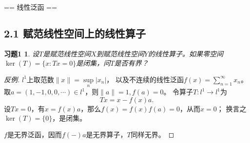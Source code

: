 \newcommand{\De}{\mathbf{\Delta}}
\newcommand{\D}{\mathbb{D}}
\newcommand{\Partial}{\mathbf{\partial}}
\newcommand{\la}{\langle}
\newcommand{\ra}{\rangle}
\theoremstyle{plain}\newtheorem*{1}{习题1}
\theoremstyle{plain}\newtheorem*{2}{习题2}
\theoremstyle{plain}\newtheorem*{3}{习题3}
\theoremstyle{plain}\newtheorem*{4}{习题4}
\theoremstyle{plain}\newtheorem*{5}{习题5}
\theoremstyle{plain}\newtheorem*{6}{习题6}
\theoremstyle{plain}\newtheorem*{7}{习题7}
\theoremstyle{plain}\newtheorem*{8}{习题8}
\theoremstyle{plain}\newtheorem*{9}{习题9}
\theoremstyle{plain}\newtheorem*{10}{习题10}
\theoremstyle{plain}\newtheorem*{11}{习题11}
\theoremstyle{plain}\newtheorem*{12}{习题12}
\theoremstyle{plain}\newtheorem*{13}{习题13}
\theoremstyle{plain}\newtheorem*{14}{习题14}
\theoremstyle{plain}\newtheorem*{15}{习题15}
\theoremstyle{plain}\newtheorem*{16}{习题16}
\theoremstyle{plain}\newtheorem*{17}{习题17}
\theoremstyle{plain}\newtheorem*{18}{习题18}
\theoremstyle{plain}\newtheorem*{19}{习题19}
\theoremstyle{plain}\newtheorem*{20}{习题20}
\theoremstyle{plain}\newtheorem*{21}{习题21}
\theoremstyle{plain}\newtheorem*{22}{习题22}
\theoremstyle{remark}\newtheorem*{remark*}{注}
\theoremstyle{remark}\newtheorem*{enhanced}{进阶}

\setcounter{section}{1}

== 线性泛函 ==

\subsection{2.1 赋范线性空间上的线性算子} 
\begin{1}
    设$T$是赋范线性空间$X$到赋范线性空间$Y$的线性算子。如果零空间
    $\ker(T)=\{x:Tx=0\}$是闭集，问$T$是否有界？
\end{1}
\begin{proof}[反例]
    $l^1$上取范数$\|x\|=\sup\limits_n |x_n|$，
    以及不连续的线性泛函$f(x)=\sum\limits_{n=1}^\infty x_n$。
    取$a=(1,-1,0,0,\cdots)\in l^1$，则$\|a\|=1,f(a)=0$。
    令算子$T\colon l^1\to l^1$为
    $$Tx=x-f(x)a.$$
    设$Tx=0$，有$x=f(x)a$，那么$f(x)=f(x)f(a)=0$，从而$x=0$；
    换言之$\ker(T)=\{0\}$，是闭集。

    $f$是无界泛函，因而$f(-)a$是无界算子，$T$同样无界。
\end{proof}

